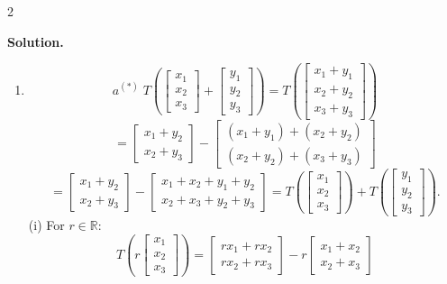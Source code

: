 \documentclass[8pt]{extarticle}
\begin{document}
\begin{multicols}{2}
\begin{tcolorbox}[title=]
\textbf{Solution.}
\begin{enumerate}
\item
\[
a^{(*)}\;T\!\left(\begin{bmatrix}x_{1}\\x_{2}\\x_{3}\end{bmatrix}
+\begin{bmatrix}y_{1}\\y_{2}\\y_{3}\end{bmatrix}\right)
=T\!\left(\begin{bmatrix}x_{1}+y_{1}\\x_{2}+y_{2}\\x_{3}+y_{3}\end{bmatrix}\right)
\]
\[
=\begin{bmatrix}x_{1}+y_{2}\\x_{2}+y_{3}\end{bmatrix}
-\begin{bmatrix}(x_{1}+y_{1})+(x_{2}+y_{2})\\(x_{2}+y_{2})+(x_{3}+y_{3})\end{bmatrix}
\]
\[
=\begin{bmatrix}x_{1}+y_{2}\\x_{2}+y_{3}\end{bmatrix}
-\begin{bmatrix}x_{1}+x_{2}+y_{1}+y_{2}\\x_{2}+x_{3}+y_{2}+y_{3}\end{bmatrix}
= T\!\left(\begin{bmatrix}x_{1}\\x_{2}\\x_{3}\end{bmatrix}\right)
+T\!\left(\begin{bmatrix}y_{1}\\y_{2}\\y_{3}\end{bmatrix}\right).
\]
(i) For \(r\in\mathbb{R}\):
\[
T\!\left(r\begin{bmatrix}x_{1}\\x_{2}\\x_{3}\end{bmatrix}\right)
=\begin{bmatrix}rx_{1}+rx_{2}\\rx_{2}+rx_{3}\end{bmatrix}
-r\begin{bmatrix}x_{1}+x_{2}\\x_{2}+x_{3}\end{bmatrix}
\]
\end{enumerate}
\end{tcolorbox}
\end{multicols}
\end{document}
